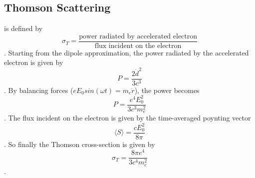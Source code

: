 \subsection{Thomson Scattering}
 is defined by
\begin{dmath*}
\sigma_T = \frac{\text{power radiated by accelerated electron}}{\text{flux incident on the electron}}
\end{dmath*}.
Starting from the dipole approximation, the power radiated by the accelerated electron is given by
\begin{dmath}
P = \frac{2{\ddot d}^2}{3c^3}
\end{dmath}.
By balancing forces ($eE_0sin(\omega t) = m_e\ddot r$), the power becomes
\begin{dmath}
P = \frac{e^4E_0^2}{3c^3m_e^2}
\end{dmath}.
The flux incident on the electron is given by the time-averaged poynting vector
\begin{dmath}
\langle S\rangle = \frac{cE_0^2}{8\pi}
\end{dmath}.
So finally the Thomson cross-section is given by
\begin{dmath}\boxed{
\sigma_T = \frac{8\pi e^4}{3c^4m_e^2}
}\end{dmath}.

